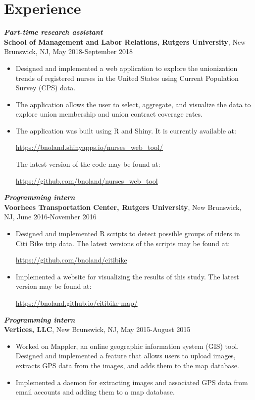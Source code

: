 \documentclass[letterpaper,12pt]{article}
\begin{document}
\section*{Experience}
\textit{\textbf{Part-time research assistant}} \\
\textbf{School of Management and Labor Relations, Rutgers University}, New Brunswick, NJ, May 
2018-September 2018
\begin{itemize}
\item
Designed and implemented a web application to explore the unionization trends of registered 
nurses in the United States using Current Population Survey (CPS) data.
\item
The application allows the user to select, aggregate, and visualize the data to explore union 
membership and union contract coverage rates.
\item
The application was built using R and Shiny. It is currently available at:
\begin{center}
\url{https://bnoland.shinyapps.io/nurses_web_tool/}
\end{center}
The latest version of the code may be found at:
\begin{center}
\url{https://github.com/bnoland/nurses_web_tool}
\end{center}
\end{itemize}

\textit{\textbf{Programming intern}} \\
\textbf{Voorhees Transportation Center, Rutgers University}, New Brunswick, NJ, June 2016-November 
2016
\begin{itemize}
\item
Designed and implemented R scripts to detect possible groups of riders in Citi Bike trip data. The 
latest versions of the scripts may be found at:
\begin{center}
\url{https://github.com/bnoland/citibike}
\end{center}

\item
Implemented a website for visualizing the results of this study. The latest version may be found at:
\begin{center}
\url{https://bnoland.github.io/citibike-map/}
\end{center}

\end{itemize}

\textit{\textbf{Programming intern}} \\
\textbf{Vertices, LLC}, New Brunswick, NJ, May 2015-August 2015
\begin{itemize}
\item
Worked on Mappler, an online geographic information system (GIS) tool. Designed and implemented a 
feature that allows users to upload images, extracts GPS data from the images, and adds them to the 
map database.
\item
Implemented a daemon for extracting images and associated GPS data from email accounts and adding 
them to a map database.
\end{itemize}
\end{document}
